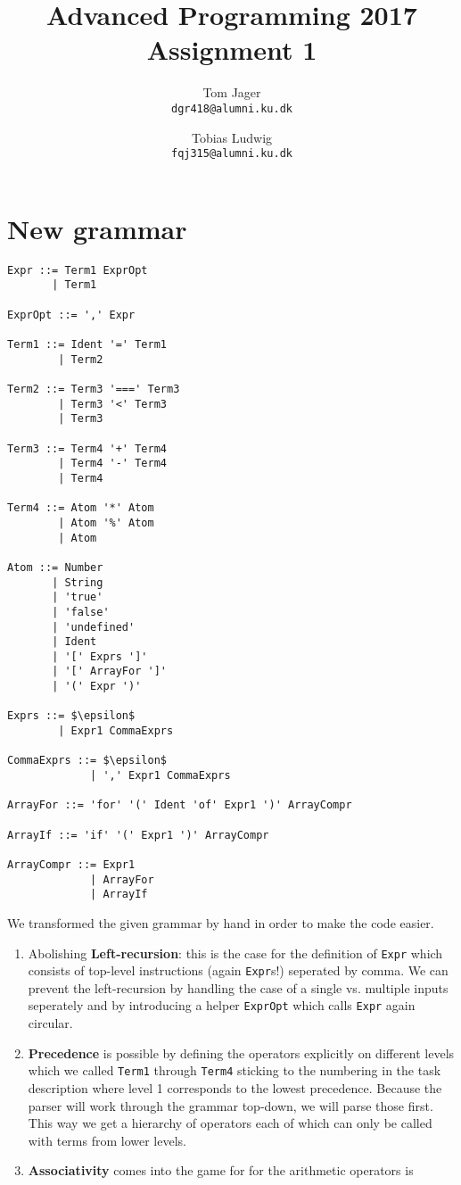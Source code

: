 \documentclass{article}
\title{Advanced Programming 2017\\Assignment 1}
\author{
Tom Jager\\
\texttt{dgr418@alumni.ku.dk}
\and
Tobias Ludwig\\
\texttt{fqj315@alumni.ku.dk}}
\begin{document}
\maketitle

\section{New grammar}

\begin{lstlisting}[mathescape]
Expr ::= Term1 ExprOpt
       | Term1

ExprOpt ::= ',' Expr

Term1 ::= Ident '=' Term1
        | Term2

Term2 ::= Term3 '===' Term3
        | Term3 '<' Term3
        | Term3

Term3 ::= Term4 '+' Term4
        | Term4 '-' Term4
        | Term4

Term4 ::= Atom '*' Atom
        | Atom '%' Atom
        | Atom

Atom ::= Number
       | String
       | 'true'
       | 'false'
       | 'undefined'
       | Ident
       | '[' Exprs ']'
       | '[' ArrayFor ']'
       | '(' Expr ')'

Exprs ::= $\epsilon$
        | Expr1 CommaExprs

CommaExprs ::= $\epsilon$
             | ',' Expr1 CommaExprs

ArrayFor ::= 'for' '(' Ident 'of' Expr1 ')' ArrayCompr

ArrayIf ::= 'if' '(' Expr1 ')' ArrayCompr

ArrayCompr ::= Expr1
             | ArrayFor
             | ArrayIf
\end{lstlisting}

We transformed the given grammar by hand in order to make the code easier.

\begin{enumerate}
 \item Abolishing \textbf{Left-recursion}: this is the case for the definition of \texttt{Expr} which consists of top-level instructions (again \texttt{Expr}s!)
 seperated by comma. We can prevent the left-recursion by handling the case of a single vs. multiple inputs seperately and by introducing
 a helper \texttt{ExprOpt} which calls \texttt{Expr} again circular.

 \item \textbf{Precedence} is possible by defining the operators explicitly on different levels which we called \texttt{Term1} through \texttt{Term4} sticking to
 the numbering in the task description where level 1 corresponds to the lowest precedence. Because the parser will work through the grammar top-down, we will parse those first.
 This way we get a hierarchy of operators each of which can only be called with terms from lower levels.
 
 \item \textbf{Associativity} comes into the game for for the arithmetic operators is 
\end{enumerate}
\end{document}
